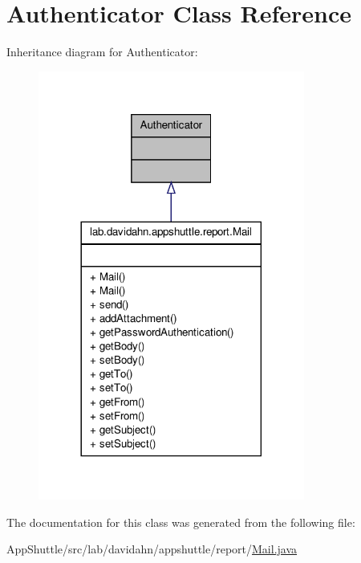 \hypertarget{classjavax_1_1mail_1_1_authenticator}{\section{\-Authenticator \-Class \-Reference}
\label{classjavax_1_1mail_1_1_authenticator}
}


\-Inheritance diagram for \-Authenticator\-:
\nopagebreak
\begin{figure}[H]
\begin{center}
\leavevmode
\includegraphics[width=248pt]{classjavax_1_1mail_1_1_authenticator__inherit__graph}
\end{center}
\end{figure}


\-The documentation for this class was generated from the following file\-:\begin{DoxyCompactItemize}
\item 
\-App\-Shuttle/src/lab/davidahn/appshuttle/report/\hyperlink{_mail_8java}{\-Mail.\-java}\end{DoxyCompactItemize}
